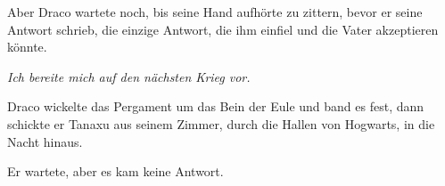 Aber Draco wartete noch, bis seine Hand aufhörte zu zittern, bevor er seine Antwort schrieb, die einzige Antwort, die ihm einfiel und die Vater akzeptieren könnte.

\emph{Ich bereite mich auf den nächsten Krieg vor.}

Draco wickelte das Pergament um das Bein der Eule und band es fest, dann schickte er Tanaxu aus seinem Zimmer, durch die Hallen von Hogwarts, in die Nacht hinaus.

Er wartete, aber es kam keine Antwort.

